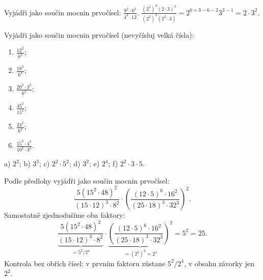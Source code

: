 \documentclass[11pt,a4paper]{article}
\begin{document}
\begin{prikladReseniBox}[title={Příklad 5 — číselný příklad z předlohy},breakable=false]
Vyjádři jako součin mocnin prvočísel:
$\displaystyle\frac{8^2\cdot6^3}{4^3\cdot12}$.
\tcblower
$\displaystyle\frac{(2^3)^2(2\cdot3)^3}{(2^2)^3(2^2\cdot3)}
=2^{6+3-6-2}3^{3-1}=\boxed{2\cdot3^2}$.
\end{prikladReseniBox}
\begin{zadaniReseniBox}[title={Samostatná práce 5 — šest rozkladů}]
Vyjádři jako součin mocnin prvočísel (nevyčísluj velká čísla):
\begin{enumerate}[label=\alph*)]
\item $\frac{12^2}{6^2}$; \item $\frac{18^3}{6^3}$;
\item $\frac{20^2\cdot3^2}{6^2}$;
\item $\frac{45^2}{15^2}$;
\item $\frac{24^2}{6^2}$;
\item $\frac{15^3\cdot4^2}{10^2\cdot3^2}$.
\end{enumerate}
\tcblower
 a) $2^2$; b) $3^3$; c) $2^2\cdot5^2$;
 d) $3^2$; e) $2^4$; f) $2^2\cdot3\cdot5$.
\end{zadaniReseniBox}
\begin{zadaniReseniBox}[title={Rozšiřující příklad 5 — velký příklad s výsledkem 25}]
Podle předlohy vyjádři jako součin mocnin prvočísel:
\[
\frac{5(15^2\cdot48)^2}{(15\cdot12)^3\cdot8^2}\cdot
\left(\frac{(12\cdot5)^6\cdot16^2}{(25\cdot18)^3\cdot32^3}\right)^2.
\]
\tcblower
Samostatně zjednodušíme oba faktory:
\[
\underbrace{\frac{5(15^2\cdot48)^2}{(15\cdot12)^3\cdot8^2}}_{=5^2/2^4}
\cdot\underbrace{\left(\frac{(12\cdot5)^6\cdot16^2}{(25\cdot18)^3\cdot32^3}\right)^2}_{=(2^2)^2=2^4}
=\boxed{5^2=25}.
\]
Kontrola bez obřích čísel: v prvním faktoru zůstane $5^2/2^4$,
v obsahu závorky jen $2^2$.
\end{zadaniReseniBox}
\end{document}
